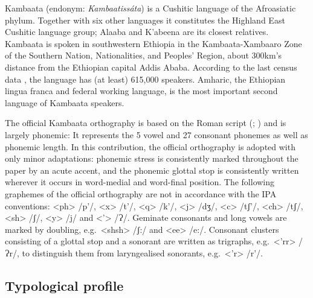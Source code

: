 \documentclass[output=paper,colorlinks,citecolor=brown,
]{langsci/langscibook}
\begin{document}
Kambaata (endonym: \textit{Kambaatissáta}) is a Cushitic language of the Afroasiatic phylum. Together with six other languages it constitutes the Highland East Cushitic language group; Alaaba and K'abeena are its closest relatives. Kambaata is spoken in southwestern Ethiopia in the Kambaata-Xambaaro Zone of the Southern Nation, Nationalities, and Peoples' Region, about 300km's distance from the Ethiopian capital Addis Ababa. According to the last census data \citep[91]{CSA2007}, the language has (at least) 615,000 speakers. Amharic, the Ethiopian lingua franca and federal working language, is the most important second language of Kambaata speakers. 

The official Kambaata orthography is based on the Roman script (\citealt[73--80]{Treis2008}; \citealt{Alemu2016}) and is largely phonemic: It represents the 5 vowel and 27 consonant phonemes as well as phonemic length. In this contribution, the official orthography is adopted with only minor adaptations: phonemic stress is consistently marked throughout the paper by an acute accent, and the phonemic glottal stop is consistently written wherever it occurs in word-medial and word-final position. The following graphemes of the official orthography are not in accordance with the IPA conventions: <ph> /p'/, <x> /t'/, <q> /k'/, <j> /dʒ/, <c> /tʃ'/, <ch> /tʃ/, <sh> /ʃ/, <y> /j/ and <'> /Ɂ/. Geminate consonants and long vowels are marked by doubling,  e.g.\ <shsh> /ʃ:/ and <ee> /e:/. Consonant clusters consisting of a glottal stop and a sonorant are written as trigraphs,  e.g.\ <'rr> /Ɂr/, to distinguish them from laryngealised sonorants,  e.g.\ <'r> /r'/.

\subsection{Typological profile}\label{sec:treis:1.2}
\end{document}
